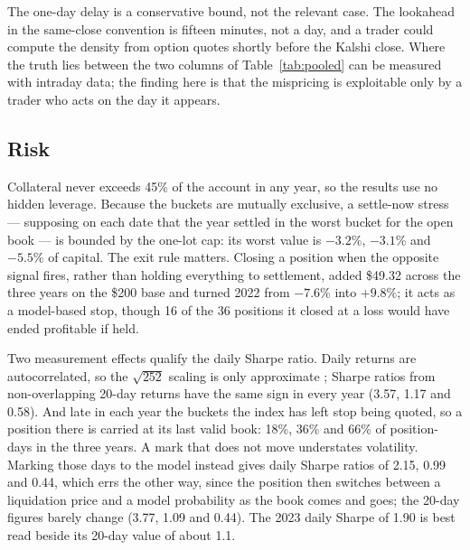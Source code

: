 \documentclass{article}
\begin{document}
The one-day delay is a conservative bound, not the relevant case. The lookahead in the same-close convention is fifteen minutes, not a day, and a trader could compute the density from option quotes shortly before the Kalshi close. Where the truth lies between the two columns of Table~\ref{tab:pooled} can be measured with intraday data; the finding here is that the mispricing is exploitable only by a trader who acts on the day it appears.

\subsection{Risk}
Collateral never exceeds 45\% of the account in any year, so the results use no hidden leverage. Because the buckets are mutually exclusive, a settle-now stress --- supposing on each date that the year settled in the worst bucket for the open book --- is bounded by the one-lot cap: its worst value is $-3.2\%$, $-3.1\%$ and $-5.5\%$ of capital. The exit rule matters. Closing a position when the opposite signal fires, rather than holding everything to settlement, added \$49.32 across the three years on the \$200 base and turned 2022 from $-7.6\%$ into $+9.8\%$; it acts as a model-based stop, though 16 of the 36 positions it closed at a loss would have ended profitable if held.

Two measurement effects qualify the daily Sharpe ratio. Daily returns are autocorrelated, so the $\sqrt{252}$ scaling is only approximate \cite{Lo2002}; Sharpe ratios from non-overlapping 20-day returns have the same sign in every year (3.57, 1.17 and 0.58). And late in each year the buckets the index has left stop being quoted, so a position there is carried at its last valid book: 18\%, 36\% and 66\% of position-days in the three years. A mark that does not move understates volatility. Marking those days to the model instead gives daily Sharpe ratios of 2.15, 0.99 and 0.44, which errs the other way, since the position then switches between a liquidation price and a model probability as the book comes and goes; the 20-day figures barely change (3.77, 1.09 and 0.44). The 2023 daily Sharpe of 1.90 is best read beside its 20-day value of about 1.1.
\end{document}
